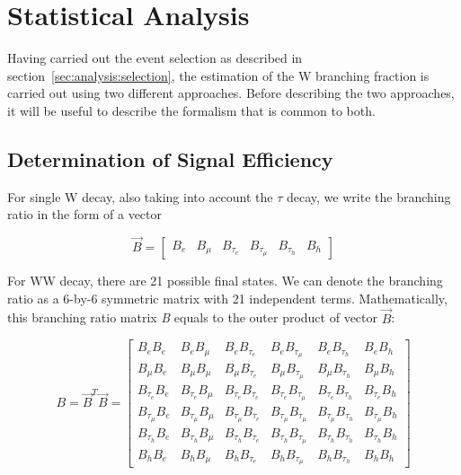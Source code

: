 \section{Statistical Analysis}



Having carried out the event selection as described in section~\ref{sec:analysis:selection}, the estimation of the W branching fraction is carried out using two different approaches.  Before describing the two approaches, it will be useful to describe the formalism that is common to both.


\subsection{Determination of Signal Efficiency}

For single W decay, also taking into account the $\tau$ decay, we write the branching 
ratio in the form of a vector

\begin{equation}
    \vec{B} = 
    \begin{bmatrix}
        B_e & B_\mu & B_{\tau_e} & B_{\tau_\mu} &  B_{\tau_h} & B_h
	\end{bmatrix} 
\end{equation}

For WW decay, there are 21 possible final states. We can denote the branching
ratio as a 6-by-6 symmetric matrix with 21 independent terms. Mathematically, 
this branching ratio matrix \textit{B} equals to the outer product of vector
$\vec{B}$:

\begin{equation}
	B = \vec{B}^T \vec{B} =
    \begin{bmatrix}
        B_e B_e             & B_e B_\mu         & B_e B_{\tau_e}            & B_e B_{\tau_\mu}          & B_e B_{\tau_h}            & B_e B_h           \\
        B_\mu B_e           & B_\mu B_\mu       & B_\mu B_{\tau_e}          & B_\mu B_{\tau_\mu}        & B_\mu B_{\tau_h}          & B_\mu B_h         \\
        B_{\tau_e} B_e      & B_{\tau_e} B_\mu  & B_{\tau_e} B_{\tau_e}     & B_{\tau_e} B_{\tau_\mu}   & B_{\tau_e} B_{\tau_h}     & B_{\tau_e} B_h    \\
        B_{\tau_\mu} B_e    & B_{\tau_\mu}B_\mu & B_{\tau_\mu} B_{\tau_e}   & B_{\tau_\mu} B_{\tau_\mu} & B_{\tau_\mu} B_{\tau_h}   & B_{\tau_\mu} B_h  \\
        B_{\tau_h} B_e      & B_{\tau_h} B_\mu  & B_{\tau_h} B_{\tau_e}     & B_{\tau_h}  B_{\tau_\mu}  & B_{\tau_h} B_{\tau_h}     & B_{\tau_h} B_h    \\
        B_h B_e             & B_h B_\mu         & B_h B_{\tau_e}            & B_h B_{\tau_\mu}          & B_h  B_{\tau_h}           & B_h  B_h 
	\end{bmatrix}
	\label{eq:br_matrix}
\end{equation}


